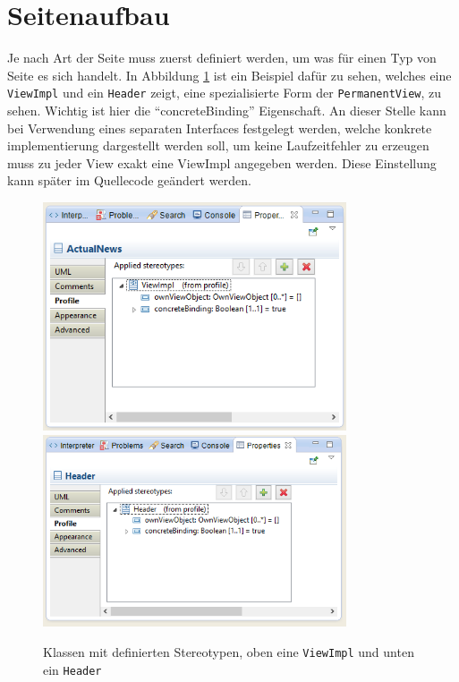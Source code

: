 \newpage
\section{Seitenaufbau}
Je nach Art der Seite muss zuerst definiert werden, um was für einen Typ von
Seite es sich handelt. In Abbildung \ref{Fig:SideProp} ist ein Beispiel dafür
zu sehen, welches eine \texttt{ViewImpl} und ein \texttt{Header} zeigt, eine
spezialisierte Form der \texttt{PermanentView}, zu sehen. Wichtig ist hier
die "`concreteBinding"' Eigenschaft. An dieser Stelle kann bei Verwendung eines
separaten Interfaces festgelegt werden, welche konkrete implementierung
dargestellt werden soll, um keine Laufzeitfehler zu erzeugen muss zu jeder View
exakt eine ViewImpl angegeben werden. Diese Einstellung kann später im
Quellecode geändert werden.

\begin{figure}[htbp]
\begin{center}
\includegraphics[width=0.8\textwidth]{./img/Prop-ViewImp.png}
\includegraphics[width=0.8\textwidth]{./img/Prop-Header.png}
\caption{Klassen mit definierten Stereotypen, oben
eine \texttt{ViewImpl} und unten ein \texttt{Header}}\label{Fig:SideProp}
\end{center}
\end{figure} 

